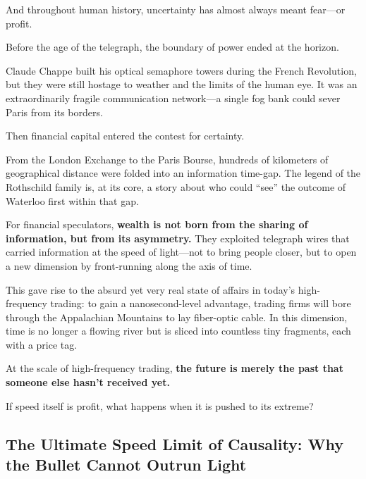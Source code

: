 And throughout human history, uncertainty has almost always meant fear---or profit.

\vspace{1em}

Before the age of the telegraph, the boundary of power ended at the horizon.

Claude Chappe built his optical semaphore towers during the French Revolution, but they were still hostage to weather and the limits of the human eye. It was an extraordinarily fragile communication network---a single fog bank could sever Paris from its borders.

\vspace{1em}

Then financial capital entered the contest for certainty.

From the London Exchange to the Paris Bourse, hundreds of kilometers of geographical distance were folded into an information time-gap. The legend of the Rothschild family is, at its core, a story about who could ``see'' the outcome of Waterloo first within that gap.

\vspace{1em}

For financial speculators, \textbf{wealth is not born from the sharing of information, but from its asymmetry.} They exploited telegraph wires that carried information at the speed of light---not to bring people closer, but to open a new dimension by front-running along the axis of time.

\vspace{1em}

This gave rise to the absurd yet very real state of affairs in today's high-frequency trading: to gain a nanosecond-level advantage, trading firms will bore through the Appalachian Mountains to lay fiber-optic cable. In this dimension, time is no longer a flowing river but is sliced into countless tiny fragments, each with a price tag.

\vspace{1em}

At the scale of high-frequency trading, \textbf{the future is merely the past that someone else hasn't received yet.}

\begin{thinkbox}
If speed itself is profit, what happens when it is pushed to its extreme?
\end{thinkbox}

\newpage
\subsection{The Ultimate Speed Limit of Causality: Why the Bullet Cannot Outrun Light}

